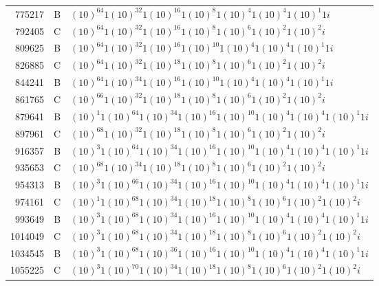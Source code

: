 \documentclass[12pt]{article}
\begin{document}
\begin{table}[H]
\begin{Parallel}[c]{0.48\textwidth}{0.48\textwidth}
{{\begin{tiny}
\begin{tabular}{rrl}
775217&B&$(10)^{64}1(10)^{32}1(10)^{16}1(10)^{8}1(10)^{4}1(10)^{4}1(10)^{1}1i$\\
792405&C&$(10)^{64}1(10)^{32}1(10)^{16}1(10)^{8}1(10)^{6}1(10)^{2}1(10)^{2}i$\\
809625&B&$(10)^{64}1(10)^{32}1(10)^{16}1(10)^{10}1(10)^{4}1(10)^{4}1(10)^{1}1i$\\
826885&C&$(10)^{64}1(10)^{32}1(10)^{18}1(10)^{8}1(10)^{6}1(10)^{2}1(10)^{2}i$\\
844241&B&$(10)^{64}1(10)^{34}1(10)^{16}1(10)^{10}1(10)^{4}1(10)^{4}1(10)^{1}1i$\\
861765&C&$(10)^{66}1(10)^{32}1(10)^{18}1(10)^{8}1(10)^{6}1(10)^{2}1(10)^{2}i$\\
879641&B&$(10)^{1}1(10)^{64}1(10)^{34}1(10)^{16}1(10)^{10}1(10)^{4}1(10)^{4}1(10)^{1}1i$\\
897961&C&$(10)^{68}1(10)^{32}1(10)^{18}1(10)^{8}1(10)^{6}1(10)^{2}1(10)^{2}i$\\
916357&B&$(10)^{3}1(10)^{64}1(10)^{34}1(10)^{16}1(10)^{10}1(10)^{4}1(10)^{4}1(10)^{1}1i$\\
935653&C&$(10)^{68}1(10)^{34}1(10)^{18}1(10)^{8}1(10)^{6}1(10)^{2}1(10)^{2}i$\\
954313&B&$(10)^{3}1(10)^{66}1(10)^{34}1(10)^{16}1(10)^{10}1(10)^{4}1(10)^{4}1(10)^{1}1i$\\
974161&C&$(10)^{1}1(10)^{68}1(10)^{34}1(10)^{18}1(10)^{8}1(10)^{6}1(10)^{2}1(10)^{2}i$\\
993649&B&$(10)^{3}1(10)^{68}1(10)^{34}1(10)^{16}1(10)^{10}1(10)^{4}1(10)^{4}1(10)^{1}1i$\\
1014049&C&$(10)^{3}1(10)^{68}1(10)^{34}1(10)^{18}1(10)^{8}1(10)^{6}1(10)^{2}1(10)^{2}i$\\
1034545&B&$(10)^{3}1(10)^{68}1(10)^{36}1(10)^{16}1(10)^{10}1(10)^{4}1(10)^{4}1(10)^{1}1i$\\
1055225&C&$(10)^{3}1(10)^{70}1(10)^{34}1(10)^{18}1(10)^{8}1(10)^{6}1(10)^{2}1(10)^{2}i$
\end{tabular}
\end{tiny}}}
\end{Parallel}
\end{table}
\end{document}

